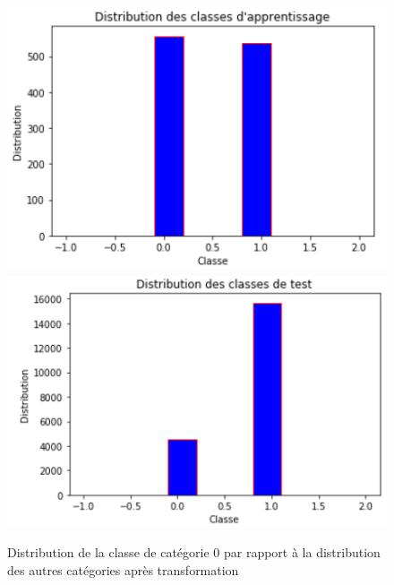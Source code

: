 \documentclass[french]{report}
\begin{document}
\begin{figure}[H]
	\includegraphics[scale = 0.6]{images/distribution_learn_supernova.PNG}
	\includegraphics[scale = 0.6]{images/distribution_test_supernova.PNG}
	\caption{Distribution de la classe de catégorie 0 par rapport à la distribution des autres catégories après transformation}
\end{figure}
\end{document}
